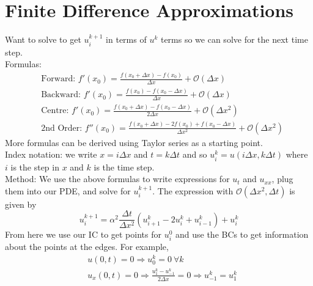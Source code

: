 \documentclass[11pt, fleqn]{article}
\newcommand{\Ra}{\Rightarrow}
\newcommand{\<}{\langle}
\renewcommand{\>}{\rangle}
\newcommand{\brround}[1]{\left( #1 \right)}
\begin{document}
\section*{Finite Difference Approximations}
Want to solve to get $u_i^{k+1}$ in terms of $u^k$ terms so we can solve for the next time step.\\
Formulas:
\begin{align*}
    &\text{Forward: }f'(x_0)=\frac{f(x_0+\Delta x)-f(x_0)}{\Delta x}+\mathcal{O}(\Delta x)\\
    &\text{Backward: } f'(x_0)=\frac{f(x_0)-f(x_0-\Delta x)}{\Delta x}+\mathcal{O}(\Delta x)\\
    &\text{Centre: }f'(x_0)=\frac{f(x_0+\Delta x)-f(x_0-\Delta x)}{2\Delta x}+\mathcal{O}(\Delta x^2)\\
    &\text{2nd Order: }f''(x_0)=\frac{f(x_0+\Delta x)-2f(x_0)+f(x_0-\Delta x)}{\Delta x^2}+\mathcal{O}(\Delta x^2)
\end{align*}
More formulas can be derived using Taylor series as a starting point.\\
Index notation: we write $x=i\Delta x$ and $t=k\Delta t$ and so $u_i^k=u(i\Delta x,k\Delta t)$ where $i$ is the step in $x$ and $k$ is the time step.\\
Method: We use the above formulas to write expressions for $u_t$ and $u_{xx}$, plug them into our PDE, and solve for $u_i^{k+1}$. The expression with $\mathcal{O}(\Delta x^2,\Delta t)$ is given by
$$u_i^{k+1}=\alpha^2\frac{\Delta t}{\Delta x^2}\brround{u_{i+1}^k-2u_i^k+u_{i-1}^k}+u_i^k$$
From here we use our IC to get points for $u^0_i$ and use the BCs to get information about the points at the edges. For example,
\begin{align*}
    &u(0,t)=0\Ra u_0^k=0\ \forall k\\
    &u_x(0,t)=0\Ra \frac{u_1^k-u_{-1}^k}{2\Delta x}=0\Ra u_{-1}^k=u_1^k
\end{align*}
\end{document}
